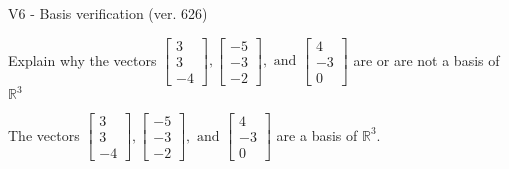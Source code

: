 \begin{exercise}
  \begin{exerciseTitle}V6 - Basis verification (ver. 626)\end{exerciseTitle}
  \begin{exerciseStatement}
    Explain why the vectors \(\left[\begin{array}{r}
3 \\
3 \\
-4
\end{array}\right] , \left[\begin{array}{r}
-5 \\
-3 \\
-2
\end{array}\right] , \text{ and } \left[\begin{array}{r}
4 \\
-3 \\
0
\end{array}\right]\) are or are not a basis of \(\mathbb{R}^3\)	


  \end{exerciseStatement}
  \begin{exerciseAnswer}
   The vectors \(\left[\begin{array}{r}
3 \\
3 \\
-4
\end{array}\right] , \left[\begin{array}{r}
-5 \\
-3 \\
-2
\end{array}\right] , \text{ and } \left[\begin{array}{r}
4 \\
-3 \\
0
\end{array}\right]\) 
  	 are  a basis of \(\mathbb{R}^3\).
  


  \end{exerciseAnswer}
\end{exercise}